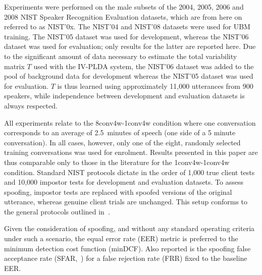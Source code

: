
Experiments were performed on the male subsets of the 2004, 2005, 2006 and 2008 NIST Speaker Recognition Evaluation datasets, which are from here on referred to as NIST'0x.  
The NIST'04 and NIST'08 datasets were used for UBM training.
The NIST'05 dataset was used for development, whereas the NIST'06 dataset was used for evaluation;  
only results for the latter are reported here.
Due to the significant amount of data necessary to estimate the total variability matrix $T$ used with the IV-PLDA system, the NIST'06 dataset was added to the pool of background data for development whereas the NIST'05 dataset was used for evaluation. 
$T$ is thus learned using approximately 11,000 utterances from 900 speakers, while independence between development and evaluation datasets is always respected.
 
All experiments relate to the 8conv4w-1conv4w condition where one conversation corresponds to an average of 2.5~minutes of speech (one side of a 5 minute conversation).  
In all cases, however, only one of the eight, randomly selected training conversations was used for enrolment.
Results presented in this paper are thus comparable only to those in the literature for the 1conv4w-1conv4w condition. 
Standard NIST protocols dictate in the order of 1,000 true client tests and 10,000 impostor tests for development and evaluation datasets. 
To assess spoofing, impostor tests are replaced with spoofed versions of the original utterance, whereas genuine client trials are unchanged.
This setup conforms to the general protocols outlined in~\cite{Wu2014a}.

Given the consideration of spoofing, and without any standard operating criteria under such a scenario, the equal error rate (EER) metric is preferred to the minimum detection cost function (minDCF).  Also reported is the spoofing false acceptance rate (SFAR,~\cite{Johnson2010}) for a false rejection rate (FRR) fixed to the baseline EER.

